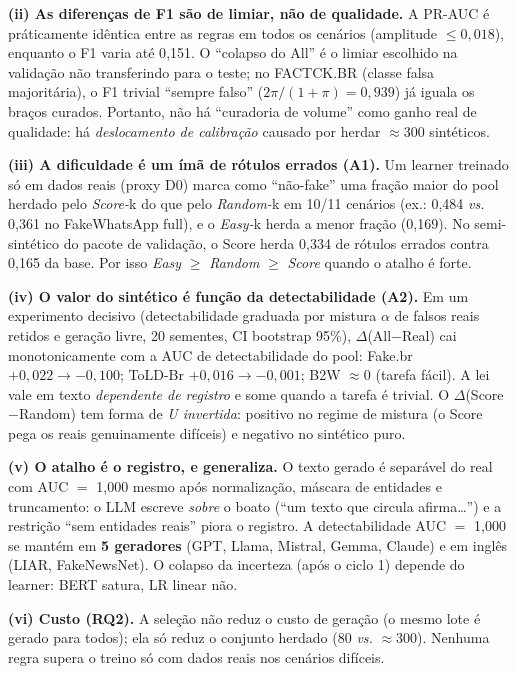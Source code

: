 \documentclass[conference]{IEEEtran}
\begin{document}
\textbf{(ii) As diferen\c{c}as de F1 s\~ao de limiar, n\~ao de qualidade.} A PR-AUC \'e pr\'aticamente id\^entica entre as regras em todos os cen\'arios (amplitude $\le 0{,}018$), enquanto o F1 varia at\'e 0{,}151. O ``colapso do All'' \'e o limiar escolhido na valida\c{c}\~ao n\~ao transferindo para o teste; no FACTCK.BR (classe falsa majorit\'aria), o F1 trivial ``sempre falso'' ($2\pi/(1{+}\pi){=}0{,}939$) j\'a iguala os bra\c{c}os curados. Portanto, n\~ao h\'a ``curadoria de volume'' como ganho real de qualidade: h\'a \emph{deslocamento de calibra\c{c}\~ao} causado por herdar $\approx$300 sint\'eticos.

\textbf{(iii) A dificuldade \'e um \'im\~a de r\'otulos errados (A1).} Um learner treinado s\'o em dados reais (proxy D0) marca como ``n\~ao-fake'' uma fra\c{c}\~ao maior do pool herdado pelo \emph{Score-}k do que pelo \emph{Random-}k em 10/11 cen\'arios (ex.: 0{,}484 \emph{vs.} 0{,}361 no FakeWhatsApp full), e o \emph{Easy-}k herda a menor fra\c{c}\~ao (0{,}169). No semi-sint\'etico do pacote de valida\c{c}\~ao, o Score herda 0{,}334 de r\'otulos errados contra 0{,}165 da base. Por isso \emph{Easy} $\ge$ \emph{Random} $\ge$ \emph{Score} quando o atalho \'e forte.

\textbf{(iv) O valor do sint\'etico \'e fun\c{c}\~ao da detectabilidade (A2).} Em um experimento decisivo (detectabilidade graduada por mistura $\alpha$ de falsos reais retidos e gera\c{c}\~ao livre, 20 sementes, CI bootstrap 95\%), $\Delta$(All$-$Real) cai monotonicamente com a AUC de detectabilidade do pool: Fake.br $+0{,}022\to-0{,}100$; ToLD-Br $+0{,}016\to-0{,}001$; B2W $\approx0$ (tarefa f\'acil). A lei vale em texto \emph{dependente de registro} e some quando a tarefa \'e trivial. O $\Delta$(Score$-$Random) tem forma de \emph{U invertida}: positivo no regime de mistura (o Score pega os reais genuinamente dif\'iceis) e negativo no sint\'etico puro.

\textbf{(v) O atalho \'e o registro, e generaliza.} O texto gerado \'e separ\'avel do real com AUC $=$ 1{,}000 mesmo ap\'os normaliza\c{c}\~ao, m\'ascara de entidades e truncamento: o LLM escreve \emph{sobre} o boato (``um texto que circula afirma\ldots'') e a restri\c{c}\~ao ``sem entidades reais'' piora o registro. A detectabilidade AUC $=$ 1{,}000 se mant\'em em \textbf{5 geradores} (GPT, Llama, Mistral, Gemma, Claude) e em ingl\^es (LIAR, FakeNewsNet). O colapso da incerteza (ap\'os o ciclo 1) depende do learner: BERT satura, LR linear n\~ao.

\textbf{(vi) Custo (RQ2).} A sele\c{c}\~ao n\~ao reduz o custo de gera\c{c}\~ao (o mesmo lote \'e gerado para todos); ela s\'o reduz o conjunto herdado (80 \emph{vs.} $\approx$300). Nenhuma regra supera o treino s\'o com dados reais nos cen\'arios dif\'iceis.
\end{document}
